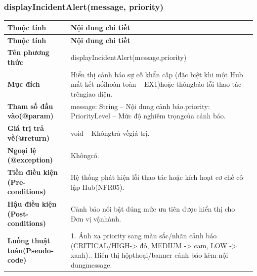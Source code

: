 \subsubsection{displayIncidentAlert(message, priority)}
\begin{longtable}{|L{0.24\textwidth}|L{0.70\textwidth}|}
\hline
\textbf{Thuộc tính} & \textbf{Nội dung chi tiết} \\
\hline
\endfirsthead
\hline
\textbf{Thuộc tính} & \textbf{Nội dung chi tiết} \\
\hline
\endhead
\textbf{Tên phương thức} & displayIncidentAlert(message,priority) \\
\hline
\textbf{Mục đích} & Hiển thị cảnh báo sự cố khẩn cấp (đặc biệt khi một Hub mất kết nối\newline hoàn toàn – EX1)hoặc thôngbáo lỗi thao tác trêngiao diện. \\
\hline
\textbf{Tham số đầu vào}\newline \textbf{(@param)} & message: String – Nội dung cảnh báo.\newline priority: PriorityLevel – Mức độ nghiêm trọngcủa cảnh báo. \\
\hline
\textbf{Giá trị trả về(@return)} & void – Khôngtrả vềgiá trị. \\
\hline
\textbf{Ngoại lệ (@exception)} & Khôngcó. \\
\hline
\textbf{Tiền điều kiện (Pre-}\newline \textbf{conditions)} & Hệ thống phát hiện lỗi thao tác hoặc kích hoạt cơ chế cô lập Hub\newline (NFR05). \\
\hline
\textbf{Hậu điều kiện (Post-}\newline \textbf{conditions)} & Cảnh báo nổi bật đúng mức ưu tiên được hiển thị cho Đơn vị vận\newline hành. \\
\hline
\textbf{Luồng thuật toán}\newline \textbf{(Pseudo-code)} & 1. Ánh xạ priority sang màu sắc/nhãn cảnh báo (CRITICAL/HIGH\newline -> đỏ, MEDIUM -> cam, LOW -> xanh).. Hiển thị hộpthoại/banner cảnh báo kèm nội dungmessage. \\
\hline
\end{longtable}
\vspace{-0.5\baselineskip}
